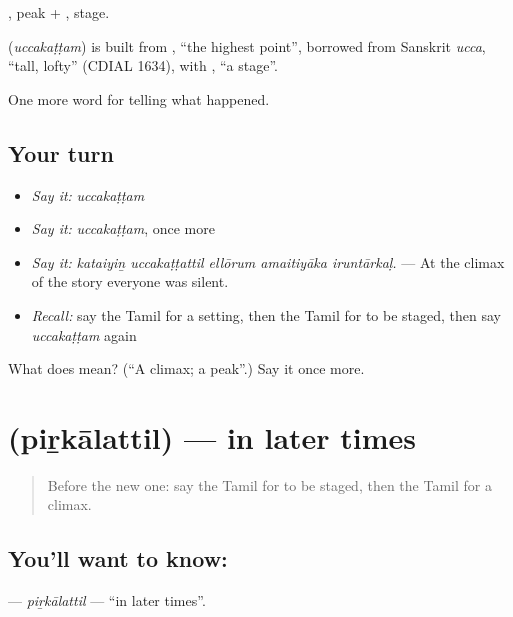 , peak + , stage.

\begin{cousinweb}
\textbf{} (\emph{uccakaṭṭam}) is built from , \textquotedblleft{}the highest point\textquotedblright{}, borrowed from Sanskrit \emph{ucca}, \textquotedblleft{}tall, lofty\textquotedblright{} (CDIAL 1634), with , \textquotedblleft{}a stage\textquotedblright{}.
\end{cousinweb}

\begin{grammarlens}[title={What you've built}]
One more word for telling what happened.
\end{grammarlens}

\subsection*{Your turn}
\begin{itemize}
\raggedright
  \item \emph{Say it:} \emph{uccakaṭṭam}
  \item \emph{Say it:} \emph{uccakaṭṭam}, once more
  \item \emph{Say it:} \emph{kataiyiṉ uccakaṭṭattil ellōrum amaitiyāka iruntārkaḷ.} — At the climax of the story everyone was silent.
  \item \emph{Recall:} say the Tamil for a setting, then the Tamil for to be staged, then say \emph{uccakaṭṭam} again
\end{itemize}

\begin{tcolorbox}[breakable,colback=teal!4,colframe=teal!35!black,title={Before you move on}]
What does  mean? (\textquotedblleft{}A climax; a peak\textquotedblright{}.) Say it once more.
\end{tcolorbox}
\section[\texorpdfstring{\ta{பிற்காலத்தில்} (piṟkālattil)}{பிற்காலத்தில் (piṟkālattil)}]{ (piṟkālattil) — in later times}

\label{lesson:TA-C346-pirkalattil}



\begin{quote}
Before the new one: say the Tamil for to be staged, then the Tamil for a climax.
\end{quote}

\subsection*{You'll want to know: }
\textbf{} — \emph{piṟkālattil} — \textquotedblleft{}in later times\textquotedblright{}.

